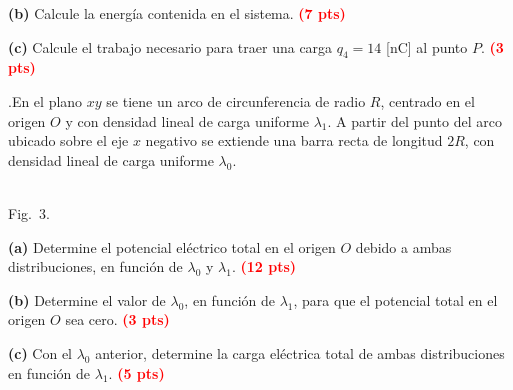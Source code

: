 \documentclass[addpoints,12pt]{exam}
\newcommand{\qpts}[1]{{\setlength{\fboxsep}{2.5pt}\fbox{#1}}\hspace{0.6em}\ignorespaces}
\newcommand{\qhead}[1]{\thequestion.\hspace{0.5em}\qpts{#1}}
\newcommand{\pts}[1]{\textcolor{red}{\textbf{(#1 pts)}}}
\begin{document}
\begin{questions}
\vspace{6cm}
\noindent\textbf{(b)} Calcule la energ\'ia contenida en el sistema. \pts{7}

\vspace{6.5cm}
\noindent\textbf{(c)} Calcule el trabajo necesario para traer una carga $q_4=14$ [nC] al punto $P$. \pts{3}

\newpage

\question[20]
\begin{minipage}[t]{0.56\textwidth}
\vspace{0pt}
\qhead{20}En el plano $xy$ se tiene un arco de circunferencia de radio $R$, centrado en el origen $O$ y
con densidad lineal de carga uniforme $\lambda_1$. A partir del punto del arco ubicado sobre el eje $x$
negativo se extiende una barra recta de longitud $2R$, con densidad lineal de carga uniforme $\lambda_0$.
\end{minipage}\hfill
\begin{minipage}[t]{0.40\textwidth}
\vspace{0pt}
\centering
{}\\[2pt]
{\footnotesize Fig.\ 3.}
\end{minipage}

\medskip
\noindent\textbf{(a)} Determine el potencial el\'ectrico total en el origen $O$ debido a ambas distribuciones, en función de $\lambda_0$ y $\lambda_1$. \pts{12}

\vspace{7.5cm}
\noindent\textbf{(b)} Determine el valor de $\lambda_0$, en funci\'on de $\lambda_1$, para que el potencial total en el origen $O$ sea cero. \pts{3}

\vspace{3cm}
\noindent\textbf{(c)} Con el $\lambda_0$ anterior, determine la carga el\'ectrica total de ambas distribuciones en funci\'on de $\lambda_1$. \pts{5}

\end{questions}
\end{document}
